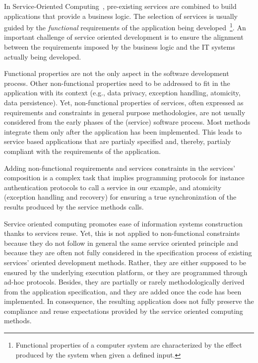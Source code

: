 




In Service-Oriented Computing~\cite{Papazoglou2007}, pre-existing services are
combined to build applications that provide a business logic.
The selection of services is usually guided by the \textit{functional} requirements of the application being developed~\cite{1,2,decastro1,PapazoglouH06}\footnote{Functional properties of a computer system are characterized by the effect produced by the system when given a defined input.}.
An important challenge of service oriented development is  to ensure the alignment between the requirements imposed by the business logic and the IT systems actually being developed.

Functional properties are not the only  aspect in the software development process.
Other non-functional properties need to be addressed to fit in the application with its context (e.g., data privacy, exception handling, atomicity, data persistence).
Yet, non-functional properties of  services, often expressed as requirements and constraints in general purpose methodologies, are not usually considered from the early phases of the (service) software process.
Most methods integrate them only after the application has been implemented.
This leads to service based applications that are partialy specified and, thereby, partialy compliant with the requirements of the application.

Adding non-functional requirements and services constraints in the services' composition is a complex task that implies programming  protocols for instance authentication protocols to call a service in our example, and atomicity (exception handling and recovery) for ensuring a true synchronization of the results produced by the service methods calls.

Service oriented computing promotes ease of information systems construction thanks to services reuse. Yet, this is not applied to non-functional constraints because they do not follow in general the same service oriented principle and because they are often not fully considered in the specification process of existing services' oriented development methods. Rather, they   are either supposed to be ensured by the underlying execution platform, or they are programmed through ad-hoc protocols. Besides,  they are partially or rarely methodologically derived from the application specification, and they are added once the code has been implemented. In consequence, the resulting application does not fully preserve the compliance and reuse expectations provided by the service oriented computing methods.

